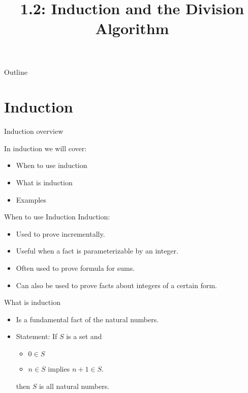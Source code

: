 \documentclass{beamer}
\title[Division Algorithm] %
{1.2: Induction and the Division Algorithm}
\begin{document}
\begin{frame}
  \titlepage
\end{frame}

\begin{frame}{Outline}
  \tableofcontents
\end{frame}




\section{Induction}

\begin{frame}{Induction overview}

  In induction we will cover:
  \begin{itemize}
  \item When to use induction
  \item What is induction
  \item Examples
  \end{itemize}
\end{frame}

\begin{frame}{When to use Induction}
  Induction:
  \begin{itemize}
  \item Used to prove incrementally.
  \item Useful when a fact is parameterizable by an integer.
  \item Often used to prove formula for sums.
  \item Can also be used to prove facts about integers of a certain
    form.
  \end{itemize}
\end{frame}

\begin{frame}{What is induction}
  \begin{itemize}
  \item Is a fundamental fact of the natural numbers.
  \item Statement: If $S$ is a set and 
    \begin{itemize}
    \item $0 \in S$
    \item $n \in S$ implies $n + 1 \in S$.
    \end{itemize}
    then $S$ is all natural numbers.
  \end{itemize}
\end{frame}
\end{document}
